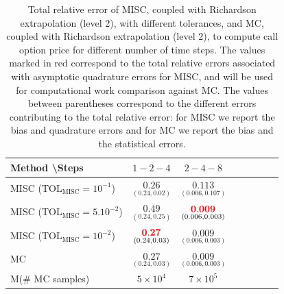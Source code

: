 \begin{table}[!h]
	\centering
	\begin{tabular}{l*{6}{c}r}
		Method \textbackslash  Steps            & $1-2-4$ & $2-4-8$  \\
		\hline

		MISC ($\text{TOL}_{\text{MISC}}=10^{-1}$)  & $\underset{(0.24,0.02)}{\mathbf{ 0.26
		}}$ & $\underset{(0.006,0.107)}{\mathbf{ 0.113}}$ \\
		MISC ($\text{TOL}_{\text{MISC}}=5.10^{-2}$)  & $\underset{(0.24,0.25)}{\mathbf{   0.49
		}}$ & $\underset{(0.006,0.003)}{\mathbf{{\color{red} 0.009} }}$  \\
		MISC ($\text{TOL}_{\text{MISC}}=10^{-2}$)  & $\underset{(0.24,0.03)}{\mathbf{ {\color{red}0.27}}}$ & $\underset{(0.006,0.003)}{\mathbf{ 0.009 }}$    \\	

		\hline
		MC   & $\underset{(0.24,0.03)}{\mathbf{0.27}}$  & $\underset{(0.006,0.003)}{\mathbf{0.009}}$    \\
			M(\# MC samples) & $5 \times 10^4$  & $7 \times 10^5$   \\
		\hline
	\end{tabular}
	\caption{Total relative  error of MISC, coupled with Richardson extrapolation (level $2$), with different tolerances, and MC, coupled with Richardson extrapolation (level $2$), to compute call option price for different number of time steps. The values marked in red correspond to the total relative errors associated with  asymptotic quadrature errors for MISC, and will be used for computational work comparison against MC. The values between parentheses correspond to the different errors contributing to the total relative error: for MISC we report the bias and quadrature errors and for MC we report the bias and the statistical errors. }
	\label{Total  error of MISC and MC to compute Call option price of the different tolerances for different number of time steps. Case set $2$ parameters, with Richardson extrapolation(level $2$). The numbers between parentheses are the corresponding absolute errors,linear}
\end{table}
\FloatBarrier

